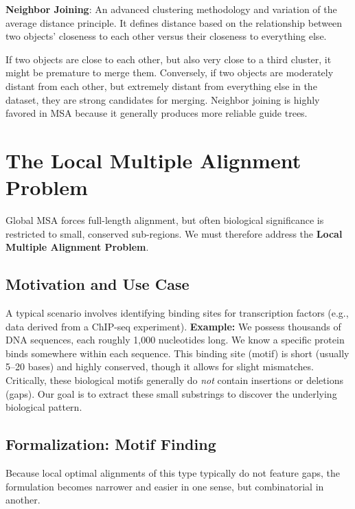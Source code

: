 \documentclass[11pt, a4paper]{article}
\newenvironment{important}
  {\begin{tcolorbox}[colback=blue!5!white, colframe=blue!75!black, arc=1mm, boxrule=1pt]}
  {\end{tcolorbox}}
\begin{document}
\begin{important}
  \textbf{Neighbor Joining}: An advanced clustering methodology and variation of the average distance principle. It defines distance based on the relationship between two objects' closeness to each other versus their closeness to everything else. 
\end{important}

If two objects are close to each other, but also very close to a third cluster, it might be premature to merge them. Conversely, if two objects are moderately distant from each other, but extremely distant from everything else in the dataset, they are strong candidates for merging. Neighbor joining is highly favored in MSA because it generally produces more reliable guide trees.


\section{The Local Multiple Alignment Problem}

Global MSA forces full-length alignment, but often biological significance is restricted to small, conserved sub-regions. We must therefore address the \textbf{Local Multiple Alignment Problem}.

\subsection{Motivation and Use Case}
A typical scenario involves identifying binding sites for transcription factors (e.g., data derived from a ChIP-seq experiment). 
\textbf{Example:} We possess thousands of DNA sequences, each roughly 1,000 nucleotides long. We know a specific protein binds somewhere within each sequence. 
This binding site (motif) is short (usually 5–20 bases) and highly conserved, though it allows for slight mismatches. Critically, these biological motifs generally do \textit{not} contain insertions or deletions (gaps). Our goal is to extract these small substrings to discover the underlying biological pattern.

\subsection{Formalization: Motif Finding}
Because local optimal alignments of this type typically do not feature gaps, the formulation becomes narrower and easier in one sense, but combinatorial in another.
\end{document}
